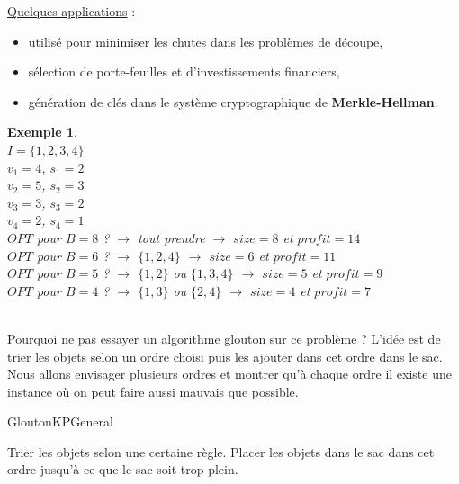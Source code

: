 \documentclass[12pt]{article}
\newtheorem{exemple}{Exemple}[section]
\begin{document}
\noindent \underline{Quelques applications} :
\begin{itemize}
\item utilisé pour minimiser les chutes dans les problèmes de découpe,
\item sélection de porte-feuilles et d'investissements financiers,
\item génération de clés dans le système cryptographique de \textbf{Merkle-Hellman}.
\end{itemize}

\begin{exemple}$ $\\
$I=\{1,2,3,4\}$ \\
$v_1 = 4$, $s_1=2$\\
$v_2 = 5$, $s_2=3$\\
$v_3 = 3$, $s_3=2$\\
$v_4 = 2$, $s_4=1$\\

\noindent $OPT$ pour $B=8$ ? $\rightarrow$ tout prendre $\longrightarrow$ $size = 8$ et $profit = 14$\\
$OPT$ pour $B=6$ ? $\rightarrow$ $\{1,2,4\}$ $\longrightarrow$ $size = 6$ et $profit = 11$\\
$OPT$ pour $B=5$ ? $\rightarrow$ $\{1,2\}$ ou $\{1,3,4\}$ $\longrightarrow$ $size = 5$ et $profit = 9$\\
$OPT$ pour $B=4$ ? $\rightarrow$ $\{1,3\}$ ou $\{2,4\}$ $\longrightarrow$ $size = 4$ et $profit = 7$
\end{exemple}

$ $\\

Pourquoi ne pas essayer un algorithme glouton sur ce problème ? L'idée est de trier les objets selon un ordre choisi puis les ajouter dans
cet ordre dans le sac. Nous allons envisager plusieurs ordres et montrer qu'à chaque ordre il existe une instance où on peut faire aussi
mauvais que possible. \\

\begin{algorithm}[H]
\caption{GloutonKPGeneral}
\begin{algorithmic}[1]
\STATE Trier les objets selon une certaine règle.
\STATE Placer les objets dans le sac dans cet ordre jusqu'à ce que le sac soit trop plein.
\end{algorithmic}
\end{algorithm}
\end{document}

